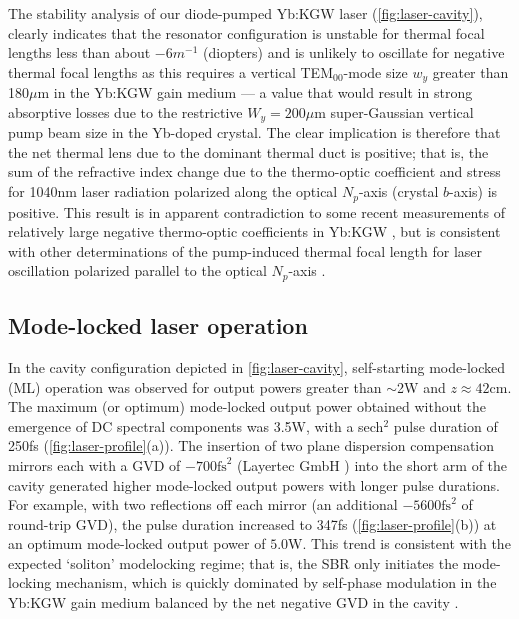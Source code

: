 The stability analysis of our diode-pumped Yb:KGW laser (\ref{fig:laser-cavity}), clearly indicates that the resonator configuration is unstable for thermal focal lengths less than about $-6m^{-1}$ (diopters) and is unlikely to oscillate for negative thermal focal lengths as this requires a vertical TEM$_{00}$-mode size $w_y$ greater than 180$\mu$m in the Yb:KGW gain medium --- a value that would result in strong absorptive losses due to the restrictive $W_y = 200\mu$m super-Gaussian vertical pump beam size in the Yb-doped crystal.
The clear implication is therefore that the net thermal lens due to the dominant thermal duct is positive; that is, the sum of the refractive index change due to the thermo-optic coefficient and stress for 1040nm laser radiation polarized along the optical $N_p$-axis (crystal $b$-axis) is positive.
This result is in apparent contradiction to some recent measurements of relatively large negative thermo-optic coefficients in Yb:KGW \cite{Biswal_thermo_optical_05}, but is consistent with other determinations of the pump-induced thermal focal length for laser oscillation polarized parallel to the optical $N_p$-axis \cite{Holtom_mode_locked_2006,Hellstrom_efficient_2006}.

\subsection{Mode-locked laser operation}

In the cavity configuration depicted in \ref{fig:laser-cavity}, self-starting mode-locked (ML) operation was observed for output powers greater than $\sim$2W and $z \approx 42$cm.
The maximum (or optimum) mode-locked output power obtained without the emergence of DC spectral components was 3.5W, with a sech$^2$ pulse duration of 250fs (\ref{fig:laser-profile}(a)).
The insertion of two plane dispersion compensation mirrors each with a GVD of $-700\text{fs}^2$ (Layertec GmbH \cite{website_layertec}) into the short arm of the cavity generated higher mode-locked output powers with longer pulse durations.
For example, with two reflections off each mirror (an additional $-5600\text{fs}^2$ of round-trip GVD), the pulse duration increased to 347fs (\ref{fig:laser-profile}(b)) at an optimum mode-locked output power of $5.0$W.
This trend is consistent with the expected `soliton' modelocking regime; that is, the SBR only initiates the mode-locking mechanism, which is quickly dominated by self-phase modulation in the Yb:KGW gain medium balanced by the net negative GVD in the cavity \cite{Brunner_diode_pumped}.

